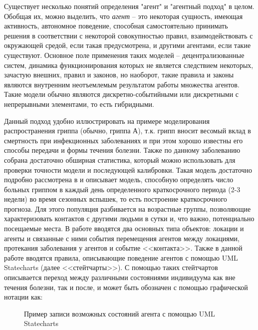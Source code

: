Существует несколько понятий определения "агент" и "агентный подход" в целом. Обобщая их, можно выделить, что  \textit{агент}  -- это некоторая сущность, имеющая активность, автономное поведение, способная самостоятельно принимать решения в соответствии с некоторой совокупностью правил, взаимодействовать с окружающей средой, если такая предусмотрена, и другими агентами, если такие существуют. Основное поле применения таких моделей -- децентрализованные систем, динамика функционирования которых не является следствием некоторых, зачастую внешних, правил и законов, но наоборот, такие правила и законы являются внутренним неотъемлемым результатом работы множества агентов. Такие модели обычно являются  дискретно-событийными или дискретными с непрерывными элементами, то есть гибридными. 

Данный подход удобно иллюстрировать на примере моделирования распространения гриппа (обычно, гриппа А), т.к. грипп вносит весомый вклад в смертность при инфекционных заболеваниях и при этом хорошо известны его способы передачи и формы течения болезни. Также по данному заболеванию собрана достаточно обширная статистика, который можно использовать для проверки точности модели и последующей калибровки.  Такая модель достаточно подробно рассмотрена в  %
\cite{Kondratiev:2010}
и описывает модель, способную определять число больных гриппом в каждый день определенного краткосрочного периода (2-3 недели) во время сезонных вспышек, то есть построение краткосрочного прогноза. Для этого популяция  разбивается на возрастные группы, позволяющие характеризовать контактов с другими людьми в сутки и, что важно, потенциально посещаемые места. В работе вводятся два основных типа объектов: локации и агенты и связанные с ними события перемещения агентов между локациями, протекания заболевания у агентов и событие <<контакта>>. Также в данной работе вводятся правила, описывающие поведение агентов с помощью UML Statecharts (далее <<стейтчарты>>). С помощью таких стейтчартов описывается переход между различными состояниями индивидуума как вне течения болезни, так и после, и может быть обозначен с помощью графической нотации как: 

\begin{figure}
	\label{UML_Diag_1}
	\caption{Пример записи возможных состояний агента с помощью UML Statecharts}
\end{figure} 


